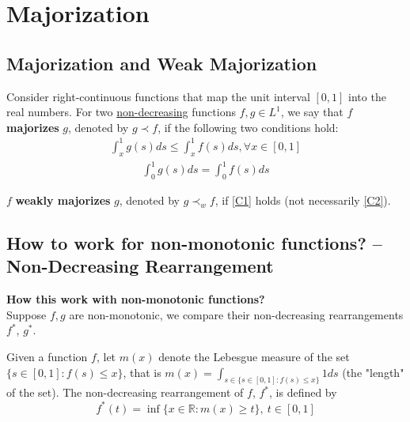 \documentclass[11pt]{elegantbook}
\begin{document}
\section{Majorization}
\subsection{Majorization and Weak Majorization}
\begin{definition}
    \normalfont
    Consider right-continuous functions that map the unit interval $[0,1]$ into the real numbers. For two \underline{non-decreasing} functions $f,g \in L^1$, we say that $f$ \textbf{majorizes} $g$, denoted by $g \prec f$, if the following two conditions hold:
    \begin{equation}
        \begin{aligned}
            \int_x^1 g(s)ds\leq \int_x^1 f(s)ds,\forall x\in [0,1]
        \end{aligned}
        \tag{Condition 1}
        \label{C1}
    \end{equation}
    \begin{equation}
        \begin{aligned}
            \int_0^1 g(s)ds=\int_0^1 f(s)ds
        \end{aligned}
        \tag{Condition 2}
        \label{C2}
    \end{equation}
\end{definition}

\begin{definition}
    \normalfont
    $f$ \textbf{weakly majorizes} $g$, denoted by $g \prec_w f$, if \ref{C1} holds (not necessarily \ref{C2}).
\end{definition}

\subsection{How to work for non-monotonic functions? -- Non-Decreasing Rearrangement}
\begin{note}
    \normalfont
    \textbf{How this work with non-monotonic functions?}\\
    Suppose $f,g$ are non-monotonic, we compare their non-decreasing rearrangements $f^*$, $g^*$.
    \begin{definition}[Rearrangement]
        \normalfont
        Given a function $f$, let $m(x)$ denote the Lebesgue measure of the set $\{s \in[0, 1]: f(s)\leq x\}$, that is $m(x)=\int_{s\in\{s \in[0, 1]: f(s)\leq x\}}1ds$ (the "length" of the set). The non-decreasing rearrangement of $f$, $f^*$, is defined by $$f^*(t) = \inf\{ x \in \mathbb{R}: m(x) \geq t\},\ t\in[0,1]$$
    \end{definition}
\end{note}
\end{document}
